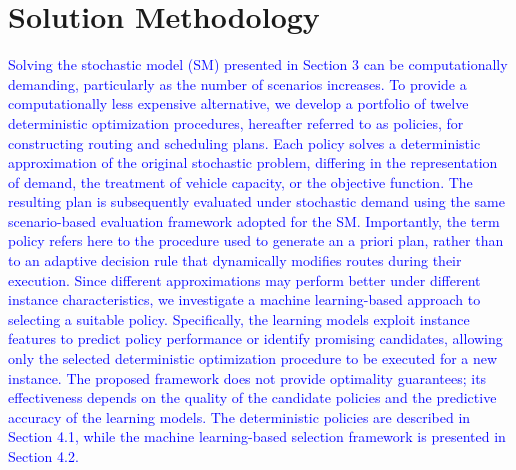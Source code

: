 \documentclass[authoryear,preprint,12pt]{elsarticle}
\newcommand{\rev}[1]{\textcolor{blue}{{#1}}}
\begin{document}
\vspace{1cm}



\section{Solution Methodology}

\rev{Solving the stochastic model (SM) presented in Section 3 can be computationally demanding, particularly as the number of scenarios increases. To provide a computationally less expensive alternative, we develop a portfolio of twelve deterministic optimization procedures, hereafter referred to as policies, for constructing routing and scheduling plans. Each policy solves a deterministic approximation of the original stochastic problem, differing in the representation of demand, the treatment of vehicle capacity, or the objective function. The resulting plan is subsequently evaluated under stochastic demand using the same scenario-based evaluation framework adopted for the SM. Importantly, the term policy refers here to the procedure used to generate an a priori plan, rather than to an adaptive decision rule that dynamically modifies routes during their execution. Since different approximations may perform better under different instance characteristics, we investigate a machine learning-based approach to selecting a suitable policy. Specifically, the learning models exploit instance features to predict policy performance or identify promising candidates, allowing only the selected deterministic optimization procedure to be executed for a new instance. The proposed framework does not provide optimality guarantees; its effectiveness depends on the quality of the candidate policies and the predictive accuracy of the learning models. The deterministic policies are described in Section 4.1, while the machine learning-based selection framework is presented in Section 4.2.}
\end{document}
